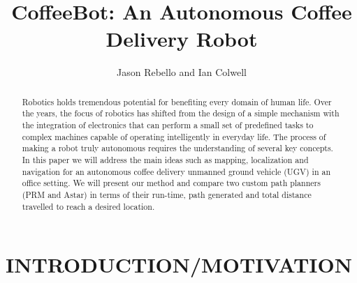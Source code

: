 \documentclass[letterpaper, 10 pt, conference]{ieeeconf}  %
\title{\LARGE \bf
CoffeeBot: An Autonomous Coffee Delivery Robot
}
\author{Jason Rebello and Ian Colwell%
}
\begin{document}
\maketitle
\thispagestyle{empty}
\pagestyle{empty}


\begin{abstract}

Robotics holds tremendous potential for benefiting every domain of human life. Over the years, the focus of robotics has shifted from the design of a simple mechanism with the integration of electronics that can perform a small set of predefined tasks to complex machines capable of operating intelligently in everyday life. The process of making a robot truly autonomous requires the understanding of several key concepts. In this paper we will address the main ideas such as mapping, localization and navigation for an autonomous coffee delivery unmanned ground vehicle (UGV) in an office setting. We will present our method and compare two custom path planners (PRM and Astar) in terms of their run-time, path generated and total distance travelled to reach a desired location.

\end{abstract}

\section{INTRODUCTION/MOTIVATION}
\end{document}
